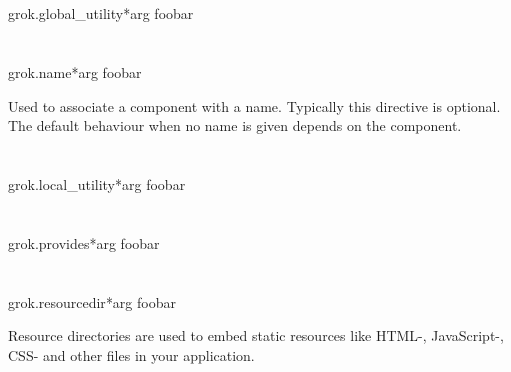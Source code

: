     \section{}

        \begin{funcdesc}{grok.global_utility}{*arg}
        foobar
        \end{funcdesc}

    \section{}

        \begin{funcdesc}{grok.name}{*arg}
        foobar
        \end{funcdesc}

        Used to associate a component with a name. Typically this directive is
        optional. The default behaviour when no name is given depends on the
        component.

    \section{}

        \begin{funcdesc}{grok.local_utility}{*arg}
        foobar
        \end{funcdesc}

    \section{}

        \begin{funcdesc}{grok.provides}{*arg}
        foobar
        \end{funcdesc}

    \section{}

        \begin{funcdesc}{grok.resourcedir}{*arg}
        foobar
        \end{funcdesc}

        Resource directories are used to embed static resources like HTML-,
        JavaScript-, CSS- and other files in your application.


